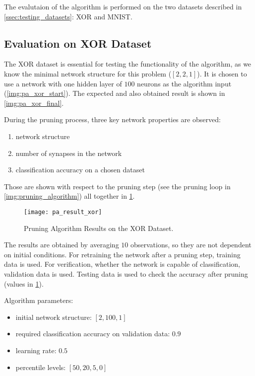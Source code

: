 The evalutaion of the algorithm is performed on the two datasets described in \cref{ssec:testing_datasets}: XOR and MNIST.

\subsection{Evaluation on XOR Dataset} \label{ssec:evaluation_on_xor}
The XOR dataset is essential for testing the functionality of the algorithm, as we know the minimal network structure for this problem ($ [2, 2, 1] $). It is chosen to use a network with one hidden layer of $ 100 $ neurons as the algorithm input (\cref{img:pa_xor_start}). The expected and also obtained result is shown in \cref{img:pa_xor_final}.

During the pruning process, three key network properties are observed:
\begin{enumerate}
\item network structure
\item number of synapses in the network
\item classification accuracy on a chosen dataset
\end{enumerate}

Those are shown with respect to the pruning step (see the pruning loop in \cref{img:pruning_algorithm}) all together in \cref{fig:pa_result_xor}.

\begin{figure}[H]
  \centering
  \texttt{[image: pa\_result\_xor]}
  \caption{Pruning Algorithm Results on the XOR Dataset.}
  \label{fig:pa_result_xor}
\end{figure}

The results are obtained by averaging $ 10 $ observations, so they are not dependent on initial conditions. For retraining the network after a pruning step, training data is used. For verification, whether the network is capable of classification, validation data is used. Testing data is used to check the accuracy after pruning (values in \cref{fig:pa_result_xor}).

Algorithm parameters:
\begin{itemize}
\item initial network structure: $ [2, 100, 1] $
\item required classification accuracy on validation data: $ 0.9 $
\item learning rate: $ 0.5 $
\item percentile levels: $ [50, 20, 5, 0] $
\end{itemize}

